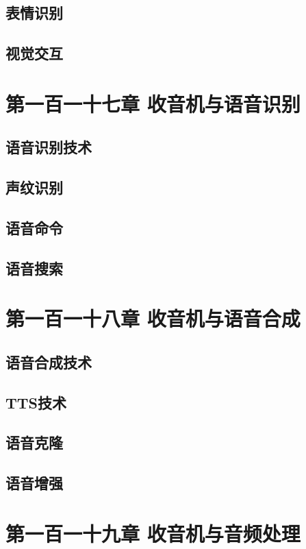 \documentclass[12pt,UTF8]{ctexbook}
\begin{document}
\section{表情识别}
\section{视觉交互}

\chapter{第一百一十七章 收音机与语音识别}

\section{语音识别技术}
\section{声纹识别}
\section{语音命令}
\section{语音搜索}

\chapter{第一百一十八章 收音机与语音合成}

\section{语音合成技术}
\section{TTS技术}
\section{语音克隆}
\section{语音增强}

\chapter{第一百一十九章 收音机与音频处理}
\end{document}
